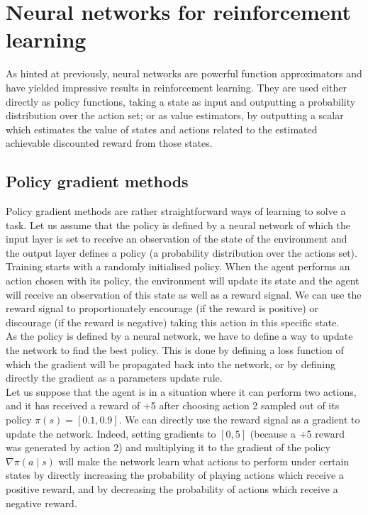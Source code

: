 \section{Neural networks for reinforcement learning}
As hinted at previously, neural networks are powerful function approximators and
have yielded impressive results in reinforcement learning. They are used either
directly as policy functions, taking a state as input and outputting a
probability distribution over the action set; or as value estimators, by 
outputting a scalar which estimates the value of states and actions related to the
estimated achievable discounted reward from those states.

\subsection{Policy gradient methods}
Policy gradient methods are rather straightforward ways of learning to solve a task.
Let us assume that the
policy is defined by a neural network of which the input layer is set to 
receive an observation of the state of the environment and the output layer
defines a policy (a probability distribution over the actions set).
Training starts with a randomly initialised policy. 
When the agent performs an action chosen with its policy, the environment will
update its state and the agent will receive an observation of this state as
well as a reward signal. We can use the reward signal to proportionately
encourage (if the reward is 
positive) or discourage (if the reward is negative) taking this action in 
this specific state.\\

As the policy is defined by a neural network, we have to define a way to
update the network to find the best policy. This is done by defining a loss
function of which the gradient will be propagated back into the network, or
by defining directly the gradient as a parameters update rule.\\

Let us suppose that the agent is in a situation where it can perform two
actions, and it has received a reward of +5 after choosing action 2
sampled out of its policy $\pi(s) = [0.1, 0.9]$. We can directly use the
reward signal as a gradient to update the network. Indeed, setting gradients
to $[0, 5]$ (because a +5 reward was generated by action 2) and multiplying it 
to the gradient of the policy $\nabla \pi(a \mid s)$ will make the network
learn what actions to perform under certain states by directly increasing the
probability of playing actions which receive a positive reward, and by
decreasing the probability of actions which receive a negative reward.\\

